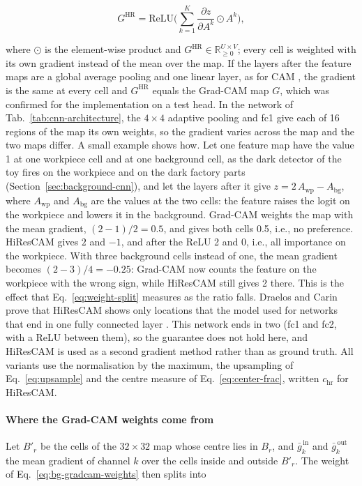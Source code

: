 \begin{equation}
G^{\mathrm{HR}} = \mathrm{ReLU}\Big( \sum_{k=1}^{K}
\frac{\partial z}{\partial A^k} \odot A^k \Big),
\label{eq:hirescam}
\end{equation}

where $\odot$ is the element-wise product and $G^{\mathrm{HR}} \in
\mathbb{R}_{\ge 0}^{U \times V}$; every cell is weighted with its own gradient instead
of the mean over the map. If the layers after the feature maps are a global average
pooling and one linear layer, as for CAM \citep{zhou2016cam}, the gradient is the same
at every cell and $G^{\mathrm{HR}}$ equals the Grad-CAM map $G$, which was confirmed for
the implementation on a test head. In the network of
Tab.~\ref{tab:cnn-architecture}, the $4 \times 4$ adaptive pooling and fc1 give each of
16 regions of the map its own weights, so the gradient varies across the map and the two
maps differ. A small example shows how. Let one feature map have the value 1 at one
workpiece cell and at one background cell, as the dark detector of the toy fires on the
workpiece and on the dark factory parts (Section~\ref{sec:background-cnn}), and let the
layers after it give $z = 2\,A_{\mathrm{wp}} - A_{\mathrm{bg}}$, where $A_{\mathrm{wp}}$
and $A_{\mathrm{bg}}$ are the values at the two cells: the feature raises the logit on
the workpiece and lowers it in the background. Grad-CAM weights the map with the mean
gradient, $(2 - 1)/2 = 0.5$, and gives both cells 0.5, i.e., no preference. HiResCAM
gives $2$ and $-1$, and after the ReLU 2 and 0, i.e., all importance on the workpiece.
With three background cells instead of one, the mean gradient becomes
$(2 - 3)/4 = -0.25$: Grad-CAM now counts the feature on the workpiece with the wrong
sign, while HiResCAM still gives 2 there. This is the effect that
Eq.~\eqref{eq:weight-split} measures as the ratio falls. Draelos and Carin prove that HiResCAM shows only locations that the model
used for networks that end in one fully connected layer \citep{draelos2021hirescam}.
This network ends in two (fc1 and fc2, with a ReLU between them), so the guarantee does
not hold here, and HiResCAM is used as a second gradient method rather than as ground
truth. All variants use the normalisation by the maximum, the upsampling of
Eq.~\eqref{eq:upsample} and the centre measure of Eq.~\eqref{eq:center-frac}, written
$c_{\mathrm{hr}}$ for HiResCAM.

\paragraph{Where the Grad-CAM weights come from}
\label{sec:methodology-weightsplit}
Let $B'_r$ be the cells of the $32 \times 32$ map whose centre lies in $B_r$, and
$\bar{g}^{\,\mathrm{in}}_k$ and $\bar{g}^{\,\mathrm{out}}_k$ the mean gradient of channel
$k$ over the cells inside and outside $B'_r$. The weight of
Eq.~\eqref{eq:bg-gradcam-weights} then splits into

